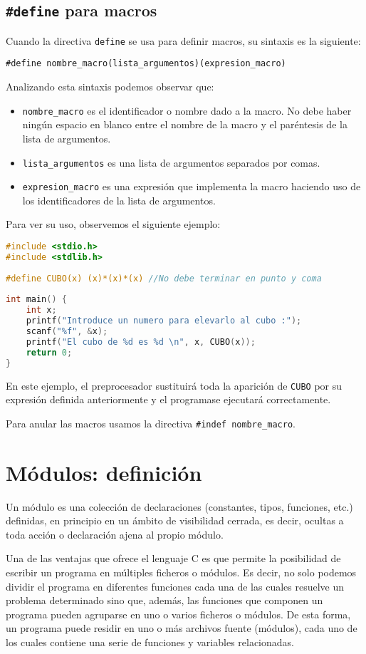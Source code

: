 \subsection{\texttt{\#define} para macros}{
Cuando la directiva \texttt{define} se usa para definir macros, su sintaxis es la siguiente:

\texttt{\#define nombre\_macro(lista\_argumentos)(expresion\_macro)}

Analizando esta sintaxis podemos observar que:
\begin{itemize}
	\item \texttt{nombre\_macro} es el identificador o nombre dado a la macro. No debe haber ningún espacio en blanco entre el nombre de la macro y el paréntesis de la lista de argumentos.
	\item \texttt{lista\_argumentos} es una lista de argumentos separados por comas.
	\item \texttt{expresion\_macro} es una expresión que implementa la macro haciendo uso de los identificadores de la lista de argumentos.
\end{itemize}
Para ver su uso, observemos el siguiente ejemplo:
\begin{Ejemplo}
\begin{lstlisting}[language=C]
#include <stdio.h>
#include <stdlib.h>
	
#define CUBO(x) (x)*(x)*(x)	//No debe terminar en punto y coma
	
int main() {
    int x;
    printf("Introduce un numero para elevarlo al cubo :");
    scanf("%f", &x);
    printf("El cubo de %d es %d \n", x, CUBO(x));
    return 0;
}
\end{lstlisting}
\Explicacion
En este ejemplo, el preprocesador sustituirá toda la aparición de \texttt{CUBO} por su expresión definida anteriormente y el programase ejecutará correctamente.
\end{Ejemplo}
\Nota
Para anular las macros usamos la directiva \texttt{\#indef nombre\_macro}.
}
\section{Módulos: definición}
Un módulo es una colección de declaraciones (constantes, tipos, funciones, etc.) definidas, en principio en un ámbito de visibilidad cerrada, es decir, ocultas a toda acción o declaración ajena al propio módulo.

Una de las ventajas que ofrece el lenguaje C es que permite la posibilidad de escribir un programa en múltiples ficheros o módulos. Es decir, no solo podemos dividir el programa en diferentes funciones cada una de las cuales resuelve un problema determinado sino que, además, las funciones que componen un programa pueden agruparse en uno o varios ficheros o módulos. De esta forma, un programa puede residir en uno o más archivos fuente (módulos), cada uno de los cuales contiene una serie de funciones y variables relacionadas.

